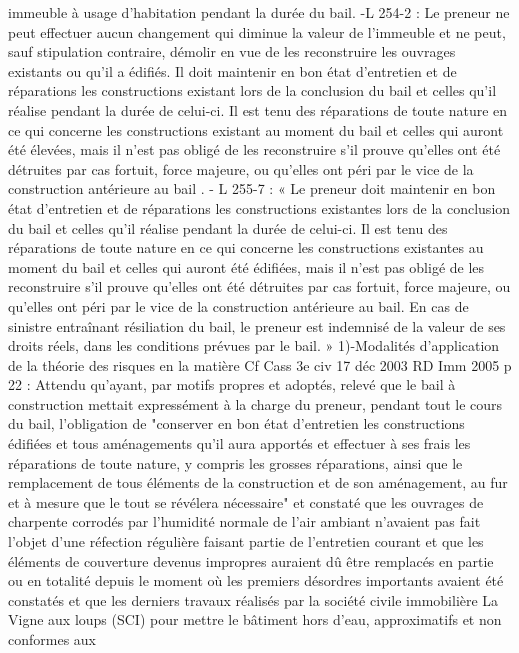 \documentclass[11pt,a4paper]{report}
\begin{document}
	immeuble à usage d'habitation pendant la durée du bail.
	-L 254-2 : Le preneur ne peut effectuer aucun changement qui diminue la valeur de l'immeuble et ne peut, sauf
	stipulation contraire, démolir en vue de les reconstruire les ouvrages existants ou qu'il a édifiés. Il doit
	maintenir en bon état d'entretien et de réparations les constructions existant lors de la conclusion du bail et
	celles qu'il réalise pendant la durée de celui-ci. Il est tenu des réparations de toute nature en ce qui concerne les
	constructions existant au moment du bail et celles qui auront été élevées, mais il n'est pas obligé de les
	reconstruire s'il prouve qu'elles ont été détruites par cas fortuit, force majeure, ou qu'elles ont péri par le vice de
	la construction antérieure au bail .
	- L 255-7 : « Le preneur doit maintenir en bon état d'entretien et de réparations les constructions existantes
	lors de la conclusion du bail et celles qu'il réalise pendant la durée de celui-ci. Il est tenu des réparations de
	toute nature en ce qui concerne les constructions existantes au moment du bail et celles qui auront été édifiées,
	mais il n'est pas obligé de les reconstruire s'il prouve qu'elles ont été détruites par cas fortuit, force majeure, ou
	qu'elles ont péri par le vice de la construction antérieure au bail. En cas de sinistre entraînant résiliation du
	bail, le preneur est indemnisé de la valeur de ses droits réels, dans les conditions prévues par le bail. »
	1)-Modalités d’application de la théorie des risques en la matière
	Cf Cass 3e civ 17 déc 2003 RD Imm 2005 p 22 : Attendu qu'ayant, par motifs propres et adoptés, relevé que le
	bail à construction mettait expressément à la charge du preneur, pendant tout le cours du bail, l'obligation de
	"conserver en bon état d'entretien les constructions édifiées et tous aménagements qu'il aura apportés et
	effectuer à ses frais les réparations de toute nature, y compris les grosses réparations, ainsi que le remplacement
	de tous éléments de la construction et de son aménagement, au fur et à mesure que le tout se révélera
	nécessaire" et constaté que les ouvrages de charpente corrodés par l'humidité normale de l'air ambiant
	n'avaient pas fait l'objet d'une réfection régulière faisant partie de l'entretien courant et que les éléments de
	couverture devenus impropres auraient dû être remplacés en partie ou en totalité depuis le moment où les
	premiers désordres importants avaient été constatés et que les derniers travaux réalisés par la société civile
	immobilière La Vigne aux loups (SCI) pour mettre le bâtiment hors d'eau, approximatifs et non conformes aux
\end{document}
